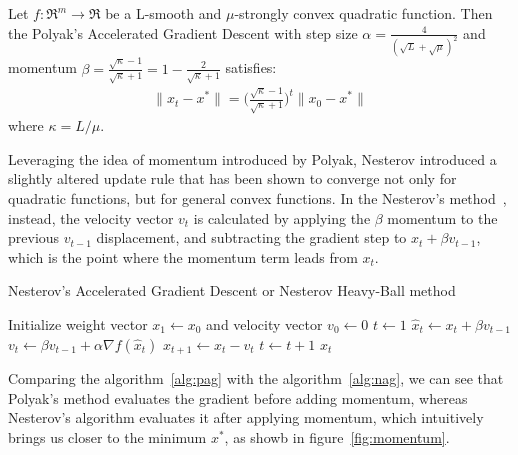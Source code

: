 \begin{theorem} \label{thm:quad_pag_convergence}
Let $f: \Re^m \rightarrow \Re$ be a L-smooth and $\mu$-strongly convex quadratic function. Then the Polyak's Accelerated Gradient Descent with step size $\alpha = \displaystyle \frac{4}{(\sqrt{L} + \sqrt{\mu})^2}$ and momentum $\beta = \displaystyle \frac{\sqrt{\kappa}-1}{\sqrt{\kappa}+1} = 1 - \frac{2}{\sqrt{\kappa}+1}$ satisfies:
$$
\begin{aligned}
	\| x_t - x^* \| = \bigg(\frac{\sqrt{\kappa}-1}{\sqrt{\kappa}+1}\bigg)^t \| x_0 - x^* \|
\end{aligned}
$$
where $\kappa = L/\mu$.
\end{theorem}

Leveraging the idea of momentum introduced by Polyak, Nesterov introduced a slightly altered update rule that has been shown to converge not only for quadratic functions, but for general convex functions. In the Nesterov's method~\cite{nesterov1998introductory}, instead, the velocity vector $v_t$ is calculated by applying the $\beta$ momentum to the previous $v_{t-1}$ displacement, and subtracting the gradient step to $x_t + \beta v_{t-1}$, which is the point where the momentum term leads from $x_t$.

\begin{algorithm}[H]
	\caption{Nesterov's Accelerated Gradient Descent or Nesterov Heavy-Ball method}
	\label{alg:nag}
	\begin{algorithmic}
		\Require{Momentum $\beta \in [0,1)$}
			\State Initialize weight vector $x_1 \gets x_0$ and velocity vector $v_0 \gets 0$
			\State $t \gets 1$
				\State $\hat{x}_t \gets x_t + \beta v_{t-1}$
				\State $v_t \gets \beta v_{t-1} + \alpha \nabla f(\hat{x}_t)$
				\State $x_{t+1} \gets x_t - v_t$
				\State $t \gets t + 1$
			\EndWhile
			\State \Return $x_t$
		\EndFunction
	\end{algorithmic}
\end{algorithm}

Comparing the algorithm~\ref{alg:pag} with the algorithm~\ref{alg:nag}, we can see that Polyak’s method evaluates the gradient before adding momentum, whereas Nesterov’s algorithm evaluates it after applying momentum, which intuitively brings us closer to the minimum $x^*$, as showb in figure~\ref{fig:momentum}.

